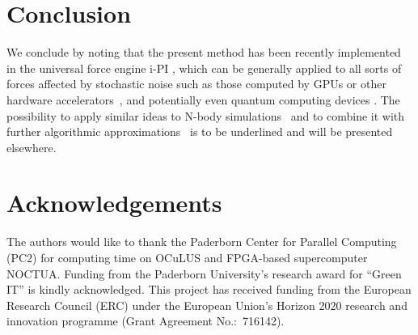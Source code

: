 \documentclass[preprint]{elsarticle}
\begin{document}
\section{Conclusion}
\label{sec:conclusion}
We conclude by noting that the present method has been recently implemented in the universal force engine i-PI \cite{iPi}, which can be generally applied to all sorts of forces affected by stochastic noise such as those computed by GPUs or other hardware accelerators~\cite{HOOMD, NAMD, OpenMM, HalMD, Lammps, Amber, Gromacs}, and potentially even quantum computing devices \cite{Steane, Knill, Blatt, Chow}. The possibility to apply similar ideas to N-body simulations~\cite{White, Makino} and to combine it with further algorithmic approximations~\cite{LassAC} is to be underlined and will be presented elsewhere.

\section*{Acknowledgements}
The authors would like to thank the Paderborn Center for Parallel Computing (PC2) for computing time on OCuLUS and FPGA-based supercomputer NOCTUA. Funding from the Paderborn University's research award for ``Green IT'' is kindly acknowledged. This project has received funding from the European Research Council (ERC) under the European Union's Horizon 2020 research and innovation programme (Grant Agreement No.:~716142).



\end{document}
